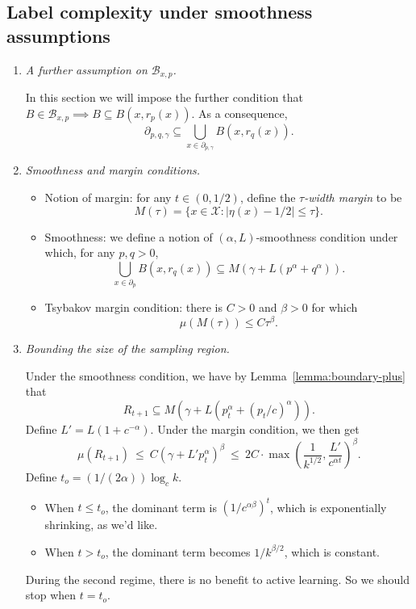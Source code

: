 \documentclass{article}
\def\X{{\mathcal X}}
\def\B{{\mathcal B}}
\begin{document}
\subsection{Label complexity under smoothness assumptions}

\begin{enumerate}

\item {\it A further assumption on $\B_{x,p}$.}

In this section we will impose the further condition that $B \in \B_{x,p} \implies B \subseteq B(x, r_p(x))$. As a consequence,
$$ \partial_{p,q,\gamma} \subseteq \bigcup_{x \in \partial_{p,\gamma}} B(x, r_q(x)) .$$

\item {\it Smoothness and margin conditions.}

\begin{itemize}
\item Notion of margin: for any $t \in (0, 1/2)$, define the {\it $\tau$-width margin} to be
$$ M(\tau) = \{x \in \X: |\eta(x) - 1/2| \leq \tau\} .$$
\item Smoothness: we define a notion of $(\alpha,L)$-smoothness condition under which, for any $p,q > 0$,
$$ \bigcup_{x \in \partial_p} B(x, r_q(x)) \subseteq M(\gamma + L(p^\alpha + q^\alpha)) .$$
\item Tsybakov margin condition: there is $C > 0$ and $\beta > 0$ for which
$$ \mu(M(\tau)) \leq C \tau^\beta.$$
\end{itemize}

\item {\it Bounding the size of the sampling region.}

Under the smoothness condition, we have by Lemma~\ref{lemma:boundary-plus} that
$$ R_{t+1} \subseteq M(\gamma + L(p_t^\alpha + (p_t/c)^\alpha)) .$$
Define $L' = L(1 + c^{-\alpha})$. Under the margin condition, we then get
$$ \mu(R_{t+1}) 
\ \leq \ 
C (\gamma + L' p_t^\alpha)^\beta 
\ \leq \ 
2C \cdot \max \left(\frac{1}{k^{1/2}}, \frac{L'}{c^{\alpha t}} \right)^\beta.
$$
Define $t_o = (1/(2 \alpha)) \log_c k$. 
\begin{itemize}
\item When $t \leq t_o$, the dominant term is $(1/c^{\alpha \beta})^t$, which is exponentially shrinking, as we'd like.
\item When $t > t_o$, the dominant term becomes $1/k^{\beta/2}$, which is constant.
\end{itemize}
During the second regime, there is no benefit to active learning. So we should stop when $t = t_o$.


\end{enumerate}
\end{document}
